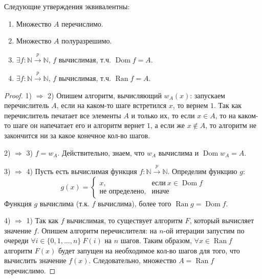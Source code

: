 \begin{statement}
  Следующие утверждения эквивалентны:
  \begin{enumerate}
    \item Множество $A$ перечислимо.
    \item Множество $A$ полуразрешимо.
    \item $\exists f : \mathbb{N} \overset{p}{\to} \mathbb{N}$, $f$ вычислимая, т.ч. $\operatorname{Dom} f = A$.
    \item $\exists f : \mathbb{N} \overset{p}{\to} \mathbb{N}$, $f$ вычислимая, т.ч. $\operatorname{Ran} f = A$.
  \end{enumerate}
  \begin{proof}
    1) $\Rightarrow$ 2) \newline
    Опишем алгоритм, вычисляющий $w_A(x)$: запускаем перечислитель $A$, если на каком-то шаге встретился $x$, то вернем $1$. Так как перечислитель печатает все элементы $A$ и только их, то если $x \in A$, то на каком-то шаге он напечатает его и алгоритм вернет $1$, а если же $x \notin A$, то алгоритм не закончится ни за какое конечное кол-во шагов. \newline
    
    2) $\Rightarrow$ 3) \newline
    $f = w_A$. Действительно, знаем, что $w_A$ вычислима и $\operatorname{Dom} w_A = A$. \newline

    3) $\Rightarrow$ 4) \newline
    Пусть есть вычислимая функция $f : \mathbb{N} \overset{p}{\to} \mathbb{N}$. Определим функцию $g$:
    \[
      g(x) = \begin{cases}
        x, & \textit{если} \> x \in \operatorname{Dom} f \\
        \textit{не определено}, & \textit{иначе}
      \end{cases}
    \]
    Функция $g$ вычислима (т.к. $f$ вычислима), более того $\operatorname{Ran} g = \operatorname{Dom} f$. \newline

    4) $\Rightarrow$ 1) \newline
    Так как $f$ вычислимая, то существует алгоритм $F$, который вычисляет значение $f$. Опишем алгоритм перечислителя: на $n$-ой итерации запустим по очереди $\forall i \in \{0, 1, \dots, n\} \> F(i)$ на $n$ шагов. Таким образом, $\forall x \in \operatorname{Ran} f$ алгоритм $F(x)$ будет запущен на необходимое кол-во шагов для того, что вычислить значение $f(x)$. Следовательно, множество $A = \operatorname{Ran} f$ перечислимо.
  \end{proof}
\end{statement}